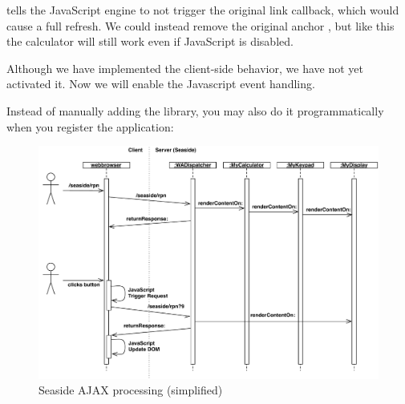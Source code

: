 \documentclass[a4paper,10pt,twoside]{book}
\begin{document}
 tells the JavaScript engine to not trigger the original link callback, which would cause a full refresh.
We could instead remove the original anchor , but like this the calculator will still work even if JavaScript is disabled.


Although we have implemented the client-side behavior, we have not yet activated it.
Now we will enable the Javascript event handling.


Instead of manually adding the library, you may also do it programmatically when you register the application:
\begin{code}{}
MyCalculator class>>>initialize
	(self registerAsApplication: 'rpn')
		addLibrary: SULibrary}}
\end{code}

\begin{figure}[ht]
\begin{center}
\includegraphics[width=\textwidth]{ajax-processing}
\caption{Seaside AJAX processing (simplified)}
\end{center}
\end{figure}

\end{document}
